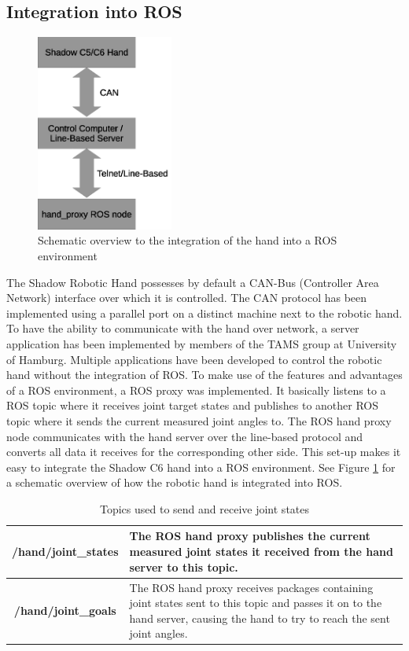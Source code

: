 \subsection{Integration into ROS}

\begin{figure}
	\vspace{-2.2em}
	\caption{\label{fig:hand:ros_integration}Schematic overview to the integration of the hand into a ROS environment}
	\includegraphics[width=0.4\textwidth]{assets/chpt_basics/hand/ros_integration.eps}
\end{figure}

The Shadow Robotic Hand possesses by default a CAN-Bus (Controller Area Network) interface over which it is controlled\cite{web:robothand:spec}. The CAN protocol has been implemented using a parallel port on a distinct machine next to the robotic hand. To have the ability to communicate with the hand over network, a server application has been implemented by members of the TAMS group at University of Hamburg. 
Multiple applications have been developed to control the robotic hand without the integration of ROS. To make use of the features and advantages of a ROS environment, a ROS proxy was implemented. It basically listens to a ROS topic where it receives joint target states and publishes to another ROS topic where it sends the current measured joint angles to. The ROS hand proxy node communicates with the hand server over the line-based protocol and converts all data it receives for the corresponding other side. This set-up makes it easy to integrate the Shadow C6 hand into a ROS environment. See Figure \ref{fig:hand:ros_integration} for a schematic overview of how the robotic hand is integrated into ROS.

\begin{table}
	\caption{\label{tab:rosmsg:topics}Topics used to send and receive joint states}
	\begin{tabularx}{\linewidth}{|c|X|}
		\hline
		\textbf{/hand/joint\_states} & The ROS hand proxy publishes the current measured joint states it received from the hand server to this topic. \\
		\hline
		\textbf{/hand/joint\_goals} & The ROS hand proxy receives packages containing joint states sent to this topic and passes it on to the hand server, causing the hand to try to reach the sent joint angles. \\
		\hline
	\end{tabularx}
\end{table}

